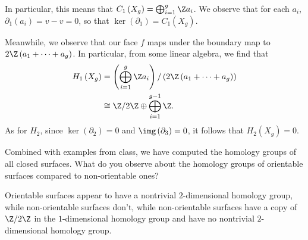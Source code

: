 \documentclass[10pt]{mypackage}
\begin{document}
\begin{solution}
\begin{center}
  \end{center}
  In particular, this means that $C_1\left( X_g \right) = \bigoplus_{i=1}^{g}\Z a_{i}$. We observe that for each $a_i$, $\partial_1\left( a_i \right) = v-v = 0$, so that $\ker\left( \partial_1 \right) = C_1\left( X_g \right)$.

  Meanwhile, we observe that our face $f$ maps under the boundary map to $2\Z\left( a_1+\cdots+a_g \right)$. In particular, from some linear algebra, we find that
  \begin{align*}
    H_1\left( X_g \right) &= \left( \bigoplus_{i=1}^{g}\Z a_i \right)/\left( 2\Z\left( a_1+\cdots+a_g \right) \right)\\
                          &\cong \Z/2\Z \oplus \bigoplus_{i=1}^{g-1}\Z.
  \end{align*}
  As for $H_2$, since $\ker\left( \partial_2 \right) = 0$ and $\img\left( \partial_3 \right) = 0$, it follows that $H_2\left( X_g \right) = 0$.
\end{solution}
\begin{problem}[Problem 2]
  Combined with examples from class, we have computed the homology groups of all closed surfaces. What do you observe about the homology groups of orientable surfaces compared to non-orientable ones?
\end{problem}
\begin{solution}
  Orientable surfaces appear to have a nontrivial $2$-dimensional homology group, while non-orientable surfaces don't, while non-orientable surfaces have a copy of $\Z/2\Z$ in the $1$-dimensional homology group and have no nontrivial $2$-dimensional homology group.
\end{solution}
\end{document}
